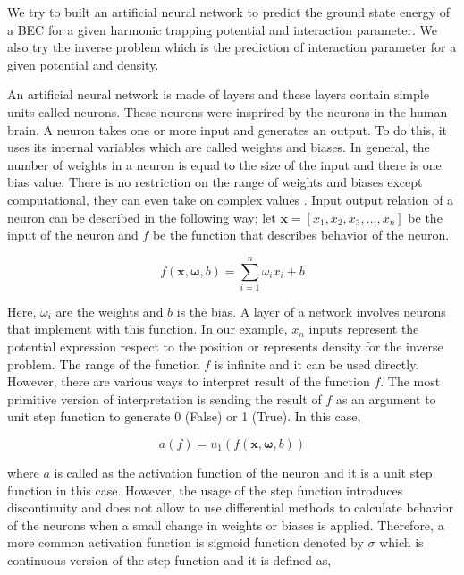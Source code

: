 \documentclass[a4paper,times,12pt]{article}
\begin{document}
We try to built an artificial neural network to predict the ground state energy of a BEC for a given harmonic trapping potential and interaction parameter. We also try the inverse problem which is the prediction of interaction parameter for a given potential and density. 

An artificial neural network is made of layers and these layers contain simple units called neurons. These neurons were insprired by the neurons in the human brain. A neuron takes one or more input and generates an output. To do this, it uses its internal variables which are called weights and biases. In general, the number of weights in a neuron is equal to the size of the input and there is one bias value. There is no restriction on the range of weights and biases except computational, they can even take on complex values \cite{zimmermann2011comparison}. Input output relation of a neuron can be described in the following way; let $\boldsymbol{x} = [x_1, x_2, x_3, ..., x_n]$ be the input of the neuron and $f$ be the function that describes behavior of the neuron. 

\begin{equation}
\label{eq:NU_neuron}
f(\boldsymbol{x}, \boldsymbol{\omega}, b) = \sum\limits_{i = 1}^n \omega_i x_i + b
\end{equation}

\noindent Here, $\omega_i$ are the weights and $b$ is the bias. A layer of a network involves neurons that implement with this function. In our example, $x_n$ inputs represent the potential expression respect to the position or represents density for the inverse problem. The range of the function $f$ is infinite and it can be used directly. However, there are various ways to interpret result of the function $f$. The most primitive version of interpretation is sending the result of $f$ as an argument to unit step function to generate 0 (False) or 1 (True). In this case, 

\begin{equation}
\label{eq:NU_step_function}
a(f) = u_1(f(\boldsymbol{x}, \boldsymbol{\omega}, b))
\end{equation}

\noindent where $a$ is called as the activation function of the neuron and it is a unit step function in this case. However, the usage of the step function introduces discontinuity and does not allow to use differential methods to calculate behavior of the neurons when a small change in weights or biases is applied. Therefore, a more common activation function is sigmoid function denoted by $\sigma$ which is continuous version of the step function and it is defined as,
\end{document}
